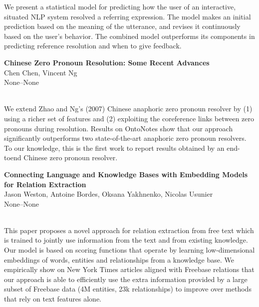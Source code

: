 \documentclass[twoside,makeidx]{book}
\renewcommand{\normalsize}{\fontsize{8}{9}\selectfont}
\renewcommand{\small}{\fontsize{7}{8}\selectfont}
\begin{document}
\nopagebreak%
\noindent%
{\small We present a statistical model for predicting how the user of an interactive, situated NLP system resolved a referring expression. The model makes an initial prediction based on the meaning of the utterance, and revises it continuously based on the user's behavior. The combined model outperforms its components in predicting reference resolution and when to give feedback.}
\par\vspace{2em}\noindent%
\begin{minipage}{\linewidth}%
\begin{center}
\textbf{\normalsize Chinese Zero Pronoun Resolution: Some Recent Advances}\\
\normalsize  Chen Chen,  Vincent Ng\\
{\small None--None}\\
\end{center}
\end{minipage}\\[0.5em]
\nopagebreak%
\noindent%
{\small We extend Zhao and Ng's (2007) Chinese anaphoric zero pronoun resolver by (1) using a richer set of features and (2) exploiting the coreference links between zero pronouns during resolution. Results on OntoNotes show that our approach significantly outperforms two state-of-the-art anaphoric zero pronoun resolvers. To our knowledge, this is the first work to report results obtained by an end-toend Chinese zero pronoun resolver.}
\par\vspace{2em}\noindent%
\begin{minipage}{\linewidth}%
\begin{center}
\textbf{\normalsize Connecting Language and Knowledge Bases with Embedding Models for Relation Extraction}\\
\normalsize  Jason Weston,  Antoine Bordes,  Oksana Yakhnenko,  Nicolas Usunier\\
{\small None--None}\\
\end{center}
\end{minipage}\\[0.5em]
\nopagebreak%
\noindent%
{\small This paper proposes a novel approach for relation extraction from free text which is trained to jointly use information from the text and from existing knowledge. Our model is based on scoring functions that operate by learning low-dimensional embeddings of words, entities and  relationships from a knowledge base. We empirically show on New York Times articles aligned with Freebase relations that our approach is able to efficiently use the extra information provided by a large subset of Freebase data (4M entities, 23k relationships) to improve over methods that rely on text features alone.}
\end{document}
